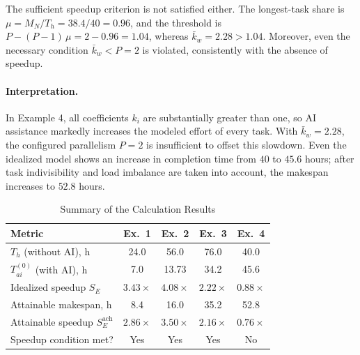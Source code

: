 The sufficient speedup criterion is not satisfied either. The longest-task
share is $\mu = M_N/T_h = 38.4/40 = 0.96$, and the threshold is
$P - (P-1)\,\mu = 2 - 0.96 = 1.04$, whereas
$\bar{k}_w = 2.28 > 1.04$. Moreover, even the necessary condition
$\bar{k}_w < P = 2$ is violated, consistently with the absence of speedup.

\paragraph{Interpretation.}
In Example 4, all coefficients $k_i$ are substantially greater than one, so
AI assistance markedly increases the modeled effort of every task. With
$\bar{k}_w = 2.28$, the configured parallelism $P=2$ is insufficient to offset
this slowdown. Even the idealized model shows an increase in completion time
from $40$ to $45.6$ hours; after task indivisibility and load imbalance are
taken into account, the makespan increases to $52.8$ hours.


\begin{table}[ht!]
\centering
\caption{Summary of the Calculation Results}
\label{tab:summary-results}
\begin{tabular}{lcccc}
\toprule
Metric & Ex.~1 & Ex.~2 & Ex.~3 & Ex.~4 \\
\midrule
$T_h$ (without AI), h & 24.0 & 56.0 & 76.0 & 40.0 \\
$T_{ai}^{(0)}$ (with AI), h & 7.0 & 13.73 & 34.2 & 45.6 \\
Idealized speedup $S_E$ & $3.43\times$ & $4.08\times$ & $2.22\times$ & $0.88\times$ \\
Attainable makespan, h & 8.4 & 16.0 & 35.2 & 52.8 \\
Attainable speedup $S_E^{\text{ach}}$ & $2.86\times$ & $3.50\times$ & $2.16\times$ & $0.76\times$ \\
Speedup condition met? & Yes & Yes & Yes & No \\
\bottomrule
\end{tabular}
\end{table}

